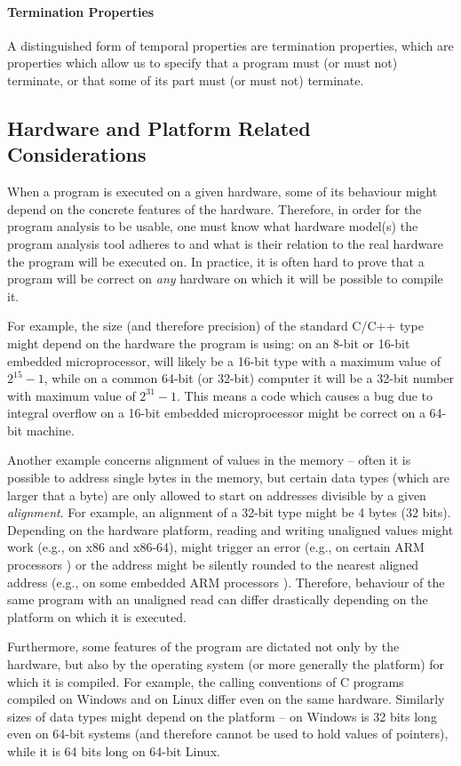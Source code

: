 \paragraph{Termination Properties}
%
A distinguished form of temporal properties are termination properties, which are properties which allow us to specify that a program must (or must not) terminate, or that some of its part must (or must not) terminate.

\subsection{Hardware and Platform Related Considerations}

When a program is executed on a given hardware, some of its behaviour might
depend on the concrete features of the hardware.
Therefore, in order for the program analysis to be usable, one must know what
hardware model(s) the program analysis tool adheres to and what is their
relation to the real hardware the program will be executed on.
In practice, it is often hard to prove that a program will be correct on
\emph{any} hardware on which it will be possible to compile it.

For example, the size (and therefore precision) of the standard C/C++ type
 might depend on the hardware the program is using: on an 8-bit or
16-bit embedded microprocessor,  will likely be a 16-bit type with a
maximum value of $2^{15} - 1$, while on a common 64-bit (or 32-bit) computer it
will be a 32-bit number with maximum value of $2^{31}-1$.
This means a code which causes a bug due to integral overflow on a 16-bit
embedded microprocessor might be correct on a 64-bit machine.

Another example concerns alignment of values in the memory -- often it is
possible to address single bytes in the memory, but certain data types (which
are larger that a byte) are only allowed to start on addresses divisible by a
given \emph{alignment}.
For example, an alignment of a 32-bit  type might be 4 bytes (32
bits).
Depending on the hardware platform, reading and writing unaligned values might
work (e.g., on x86 and x86-64), might trigger an error (e.g., on certain ARM
processors \cite{??}) or the address might be silently rounded to the nearest
aligned address (e.g., on some embedded ARM processors \cite{??}).
Therefore, behaviour of the same program with an unaligned read can differ
drastically depending on the platform on which it is executed.

Furthermore, some features of the program are dictated not only by the
hardware, but also by the operating system (or more generally the platform) for
which it is compiled.
For example, the calling conventions of C programs compiled on Windows and on
Linux differ even on the same hardware.
Similarly sizes of data types might depend on the platform -- on Windows
 is 32 bits long even on 64-bit systems (and therefore cannot be used
to hold values of pointers), while it is 64 bits long on 64-bit Linux.


